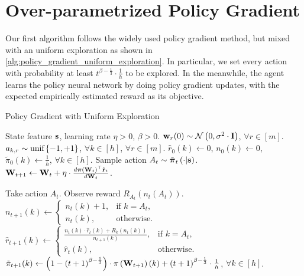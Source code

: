 \section{Over-parametrized Policy Gradient}
\label{sec:policy_gradient}

Our first algorithm follows the widely used policy gradient method, but mixed with an uniform exploration as shown in \cref{alg:policy_gradient_uniform_exploration}. In particular, we set every action with probability at least $t^{ \beta - \frac{1}{3}} \cdot \frac{1}{h}$ to be explored. In the meanwhile, the agent learns the policy neural network by doing policy gradient updates, with the expected empirically estimated reward as its objective.

\begin{algorithm}[t]
   \caption{Policy Gradient with Uniform Exploration}
\label{alg:policy_gradient_uniform_exploration}
\begin{algorithmic}
    State feature ${\mathbf{s}}$, learning rate $\eta > 0$, $\beta > 0$.
   \STATE ${\mathbf{w}}_r(0) \sim {\mathcal{N}}\left( 0, \sigma^2 \cdot {\mathbf{I}} \right)$, $\forall r \in [m]$. $a_{k, r} \sim 
   {\text{unif}}\left\{-1, +1\right\}$, $\forall k \in [h]$, $\forall r \in [m]$.
   \STATE $\hat{r}_{0}(k) \gets 0$, $n_{0}(k) \gets 0$, $\tilde{\pi}_0(k) \gets \frac{1}{h}$, $\forall k \in [h]$.
   \STATE Sample action $A_{t} \sim \tilde{{\boldsymbol{\pi}}}_{t}\left(\cdot \middle| {\mathbf{s}} \right)$.
   \STATE ${\mathbf{W}}_{t+1} \leftarrow {\mathbf{W}}_t + \eta \cdot \frac{d {\boldsymbol{\pi}}\left({\mathbf{W}}_t\right)^\top \hat{{\mathbf{r}}}_t}{d {\mathbf{W}}_t}$.
   
   \STATE Take action $A_{t}$. Observe reward $R_{ A_{t}}\left(n_{t}\left(A_t\right) \right)$.
   \STATE $n_{t+1}(k) \gets \left. 
		\begin{cases}
		n_{t}(k) + 1, & \text{if } k = A_t, \\
		n_{t}(k), & \text{otherwise}.
		\end{cases}
		\right. \qquad$ 
   $\hat{r}_{t+1}(k) \gets \left. 
		\begin{cases}
		\frac{n_{t}(k) \cdot \hat{r}_{t}(k) + R_{k}\left(n_{t}(k)\right) }{n_{t+1}(k)}, & \text{if } k = A_t, \\
		\hat{r}_{t}(k), & \text{otherwise}.
		\end{cases}
		\right.$
   \STATE $\tilde{\pi}_{t+1}(k) \gets \left( 1 - \left(t+1\right)^{ \beta - \frac{1}{3}} \right) \cdot \pi\left({\mathbf{W}}_{t+1}\right)(k) + \left(t+1\right)^{ \beta - \frac{1}{3}} \cdot \frac{1}{h}$, $\forall k \in [h]$.
   \ENDFOR
\end{algorithmic}
\end{algorithm}


